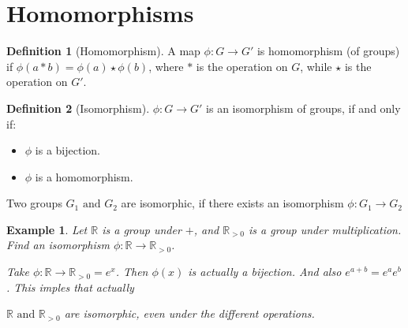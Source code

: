 \documentclass{article}
\theoremstyle{MyNonumberplain}
\theoremstyle{break}
\newcommand{\infixand}{\text{ and }}
\theoremstyle{break}
\newtheorem{example}{Example}[section]
\theoremstyle{break}
\theoremstyle{definition}
\theoremstyle{break}
\newtheorem{definition}{Definition}[section]
\begin{document}
\setcounter{section}{12}

\section{Homomorphisms}

\begin{defbox}
    \begin{definition}[Homomorphism]
        A map $\phi : G \rightarrow G'$ is homomorphism (of groups) if $\phi (a \ast
        b) = \phi (a) \star \phi (b)$, where $\ast$ is the operation on $G$, while $\star$ is the operation on $G'$. 
    \end{definition}
\end{defbox}

\begin{defbox}
    \begin{definition}[Isomorphism]
        $\phi : G \rightarrow G'$ is an isomorphism of groups, if and only if:\bigskip
        \begin{itemize}
        \item $\phi$ is a bijection.\bigskip
        
        \item $\phi$ is a homomorphism.\bigskip
        \end{itemize}
        Two groups $G_1 \infixand G_2$ are isomorphic, if there exists an isomorphism
        $\phi : G_1 \rightarrow G_2$
    \end{definition}
\end{defbox}

\begin{expbox}
    \begin{example}
        Let $\mathbb{R}$ is a group under $+$, and $\mathbb{R}_{> 0}$ is a group under
        multiplication. Find an isomorphism $\phi : \mathbb{R} \rightarrow
        \mathbb{R}_{> 0}$.
        
            \begin{ansbox}
                Take $\phi : \mathbb{R} \rightarrow \mathbb{R}_{> 0} = e^x$. Then $\phi (x)$
                is actually a bijection. And also $e^{a + b} = e^a e^b$. This imples that
                actually

                $\mathbb{R} \infixand \mathbb{R}_{> 0}$ are isomorphic, even under the
                different operations. 
            \end{ansbox}

    \end{example}
\end{expbox}
\end{document}
